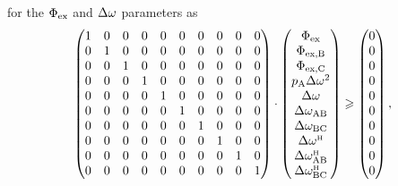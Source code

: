 for the $\Phi_{\textrm{ex}}$ and $\Delta\omega$ parameters as
\begin{equation}
    \begin{pmatrix}
        1 & 0 & 0 & 0 & 0 & 0 & 0 & 0 & 0 & 0 \\
        0 & 1 & 0 & 0 & 0 & 0 & 0 & 0 & 0 & 0 \\
        0 & 0 & 1 & 0 & 0 & 0 & 0 & 0 & 0 & 0 \\
        0 & 0 & 0 & 1 & 0 & 0 & 0 & 0 & 0 & 0 \\
        0 & 0 & 0 & 0 & 1 & 0 & 0 & 0 & 0 & 0 \\
        0 & 0 & 0 & 0 & 0 & 1 & 0 & 0 & 0 & 0 \\
        0 & 0 & 0 & 0 & 0 & 0 & 1 & 0 & 0 & 0 \\
        0 & 0 & 0 & 0 & 0 & 0 & 0 & 1 & 0 & 0 \\
        0 & 0 & 0 & 0 & 0 & 0 & 0 & 0 & 1 & 0 \\
        0 & 0 & 0 & 0 & 0 & 0 & 0 & 0 & 0 & 1 \\
    \end{pmatrix}
    \cdot
    \begin{pmatrix}
        \Phi_{\textrm{ex}} \\
        \Phi_{\textrm{ex,B}} \\
        \Phi_{\textrm{ex,C}} \\
        p_{\textrm{A}}\Delta\omega^2 \\
        \Delta\omega \\
        \Delta\omega_{\textrm{AB}} \\
        \Delta\omega_{\textrm{BC}} \\
        \Delta\omega^{\scriptscriptstyle\mathrm{H}} \\
        \Delta\omega^{\scriptscriptstyle\mathrm{H}}_{\textrm{AB}} \\
        \Delta\omega^{\scriptscriptstyle\mathrm{H}}_{\textrm{BC}} \\
    \end{pmatrix}
    \geqslant
    \begin{pmatrix}
        0 \\
        0 \\
        0 \\
        0 \\
        0 \\
        0 \\
        0 \\
        0 \\
        0 \\
        0 \\
    \end{pmatrix},
\end{equation}

